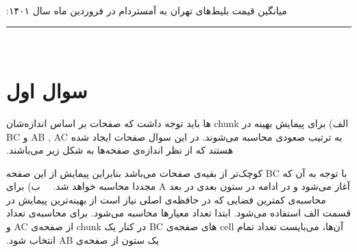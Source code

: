 ‫

‫‫میانگین قیمت بلیط‌های تهران به آمستردام در فروردین ماه سال ۱۴۰۱: \newline
‫
‫
‫\vspace{1cm}
‫
‫\hrule height .4 pt depth 0 pt width 16 cm \relax
‫
‫%
‫
‫‫\section{سوال اول}
‫
‫الف)‌ برای پیمایش بهینه در chunk ها باید توجه داشت که صفحات بر اساس اندازه‌شان به ترتیب صعودی محاسبه می‌شوند. در این سوال صفحات ایجاد شده AB , AC و BC هستند که از نظر اندازه‌ی صفحه‌ها به شکل زیر می‌باشند.
‫
\begin{center}
\end{center}

‫با توجه به آن که BC کوچک‌تر از بقیه‌ی صفحات می‌باشد بنابراین پیمایش از این صفحه آغاز می‌شود و در ادامه در ستون بعدی در بعد A مجددا محاسبه خواهد شد.
‫
‫‫\vspace{1cm}
‫
‫ب) برای محاسبه‌ی کمترین فضایی که در حافظه‌ی اصلی نیاز است از بهینه‌ترین پیمایش در قسمت الف استفاده می‌شود. ابتدا تعداد معیارها محاسبه می‌شود. برای محاسبه‌ی تعداد آن‌ها، می‌بایست تعداد تمام cell های صفحه‌ی BC در کنار یک chunk از صفحه‌ی AC و یک ستون از صفحه‌ی AB انتخاب شود.
‫

